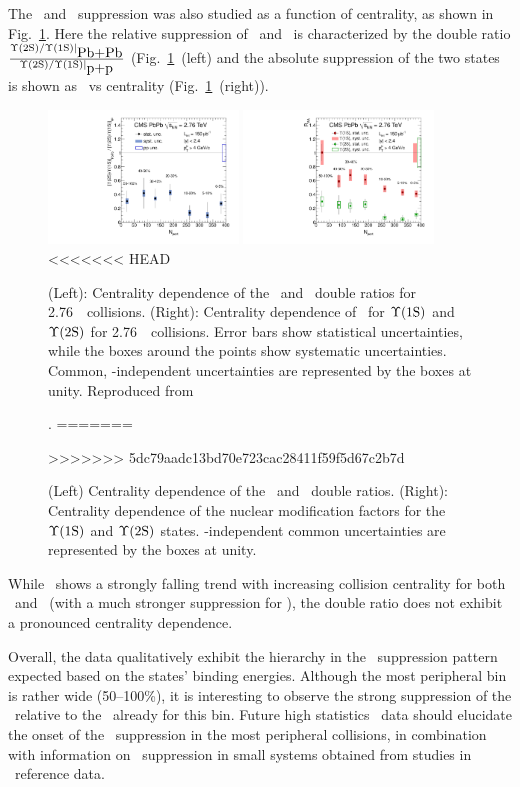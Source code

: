 The \PgUa\ and \PgUb\ suppression was also studied as a function of centrality,
as shown in Fig.~\ref{fig:GR:centrality}.
Here the relative suppression of \PgUa\ and \PgUb\ is characterized by
the double ratio $\frac{\Upsilon\mathrm{(2S)}/\Upsilon\mathrm{(1S)}|_{\mbox{Pb+Pb}}}{\Upsilon\mathrm{(2S)}/\Upsilon\mathrm{(1S)}|_{\mbox{p+p}}}$
(Fig.~\ref{fig:GR:centrality}~(left) and the absolute suppression
of the two states is shown as \Raa\ vs centrality (Fig.~\ref{fig:GR:centrality}~(right)).

\begin{figure}[t]
\begin{center}
   \includegraphics[width=0.45\textwidth]{qqbarfigures/chi2VsCent}
   \includegraphics[width=0.45\textwidth]{qqbarfigures/RaaPt4}
<<<<<<< HEAD
  \caption{(Left): Centrality dependence of the \PgUa\ and \PgUb\ double ratios
for 2.76\TeV\ \PbPb\ collisions.  (Right): 
Centrality dependence of \Raa\ for $\Upsilon\mathrm{(1S)}$ and $\Upsilon\mathrm{(2S)}$ for 2.76\TeV\ \PbPb\ collisions.
Error bars show statistical uncertainties, while the boxes around the points
show systematic uncertainties. Common, \npart-independent 
uncertainties are represented by the boxes at unity. Reproduced from~\cite{}}.
=======
  \caption{(Left) Centrality dependence of the \PgUa\ and \PgUb\ double ratios.  (Right):
Centrality dependence of the nuclear modification factors for the $\Upsilon\mathrm{(1S)}$ and $\Upsilon\mathrm{(2S)}$ states.
\npart-independent common uncertainties are represented by the boxes at unity.}
>>>>>>> 5dc79aadc13bd70e723cac28411f59f5d67c2b7d
\label{fig:GR:centrality}
\end{center}
\end{figure}

While \Raa\ shows a strongly falling trend with increasing collision centrality
for both \PgUa\ and \PgUb\ (with a much stronger suppression for \PgUb), the
double ratio does not exhibit a pronounced centrality dependence.

Overall, the data qualitatively exhibit the hierarchy in the \PgUn\ suppression pattern
expected based on the states' binding energies. Although the most peripheral bin
is rather wide (50--100\%), it is interesting to observe the strong suppression of the
\PgUb\ relative to the \PgUa\ already for this bin. Future high statistics \PbPb\ data
should elucidate the onset of the \PgU\ suppression in the most peripheral collisions,
in combination with information on \PgU\ suppression in small systems obtained from
studies in \pPb\ reference data.

